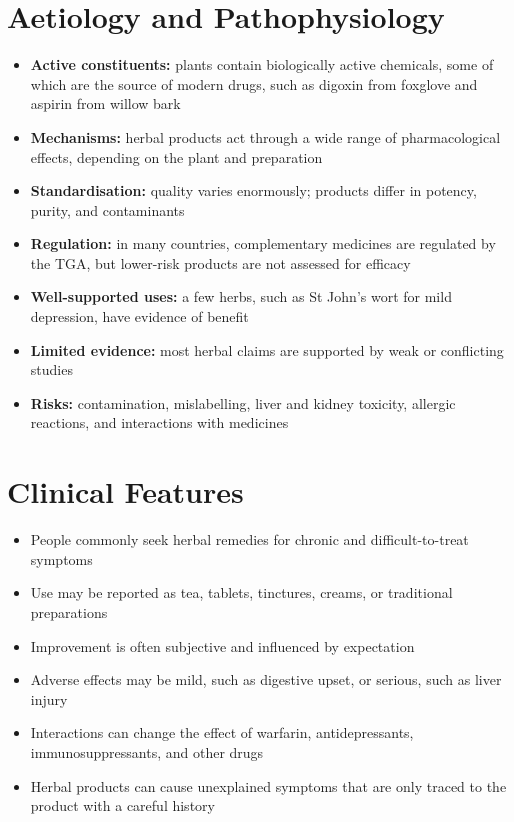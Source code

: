 \section*{Aetiology and Pathophysiology}
\begin{itemize}
    \item \textbf{Active constituents:} plants contain biologically active chemicals, some of which are the source of modern drugs, such as digoxin from foxglove and aspirin from willow bark
    \item \textbf{Mechanisms:} herbal products act through a wide range of pharmacological effects, depending on the plant and preparation
    \item \textbf{Standardisation:} quality varies enormously; products differ in potency, purity, and contaminants
    \item \textbf{Regulation:} in many countries, complementary medicines are regulated by the TGA, but lower-risk products are not assessed for efficacy
    \item \textbf{Well-supported uses:} a few herbs, such as St John's wort for mild depression, have evidence of benefit
    \item \textbf{Limited evidence:} most herbal claims are supported by weak or conflicting studies
    \item \textbf{Risks:} contamination, mislabelling, liver and kidney toxicity, allergic reactions, and interactions with medicines
\end{itemize}

\section*{Clinical Features}
\begin{itemize}
    \item People commonly seek herbal remedies for chronic and difficult-to-treat symptoms
    \item Use may be reported as tea, tablets, tinctures, creams, or traditional preparations
    \item Improvement is often subjective and influenced by expectation
    \item Adverse effects may be mild, such as digestive upset, or serious, such as liver injury
    \item Interactions can change the effect of warfarin, antidepressants, immunosuppressants, and other drugs
    \item Herbal products can cause unexplained symptoms that are only traced to the product with a careful history
\end{itemize}

